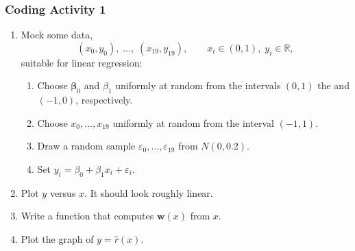 \documentclass[xcolor={dvipsnames}]{beamer}
\renewcommand{\epsilon}{\varepsilon}
\renewcommand{\hat}{\widehat}
\newcommand{\vw}{\mathbf{w}}
\newcommand{\vbeta}{\boldsymbol{\beta}}
\newcommand{\RR}{\mathbb{R}}
\begin{document}
\begin{frame}
    \frametitle{Coding Activity 1}
    \begin{enumerate}
        \setlength\parskip{0.5em}
        \item Mock some data, \[
            (x_0, y_0),\;\ldots,\;(x_{19}, y_{19}),\qquad x_i\in(0,1),\; y_i\in\RR,
        \]
        suitable for linear regression:
                \begin{enumerate}
                    \setlength\parskip{0.5em}
                    \item Choose $\vbeta_0$ and $\beta_1$ uniformly at random from the intervals $(0,1)$ the and $(-1, 0)$, respectively.
                    \item Choose $x_0,\ldots,x_{19}$ uniformly at random from the interval $(-1, 1)$.
                    \item Draw a random sample $\epsilon_0,\ldots,\epsilon_{19}$ from $N(0,0.2)$.
                    \item Set $y_i = \beta_0 + \beta_1 x_i + \epsilon_i$.
                \end{enumerate}
            \item Plot $y$ versus $x$. It should look roughly linear.
            \item Write a function that computes $\vw(x)$ from $x$.
            \item Plot the graph of $y=\hat r(x)$.
    \end{enumerate}
    \end{frame}
    
    
\end{document}
